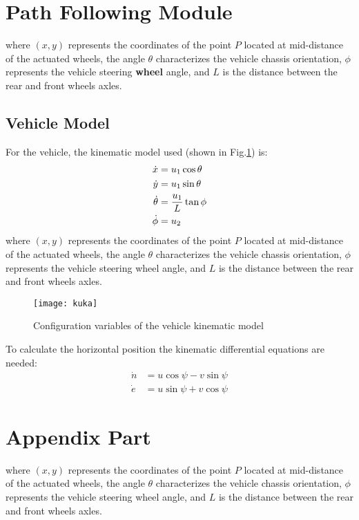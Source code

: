 \section{Path Following Module }
where $(x, y)$ represents the coordinates of the point $P$ located at mid-distance of the actuated wheels, the angle $\theta$ characterizes the vehicle chassis orientation, $\phi$ represents the vehicle steering \textbf{wheel} angle, and $L$ is the distance between the rear and front wheels axles.

\subsection{Vehicle Model}
For the vehicle, the kinematic model used (shown in Fig.\ref{fig:configurationVariables}) is:
\begin{align}
\dot{x} &= u_1 \cos\theta \notag\\
\dot{y} &= u_1 \sin\theta \notag\\
\dot{\theta} &=\frac{u_1 }{L} \tan\phi \notag\\
\dot{\phi} &= u_2
\label{eq:kinematicModel}
\end{align}
where $(x, y)$ represents the coordinates of the point $P$ located at mid-distance of the actuated wheels, the angle $\theta$ characterizes the vehicle chassis orientation, $\phi$ represents the vehicle steering wheel angle, and $L$ is the distance between the rear and front wheels axles.
\begin{figure}[htbp]
	\centering
    \texttt{[image: kuka]}
    \caption{Configuration variables of the vehicle kinematic model}
	\label{fig:configurationVariables}
\end{figure}

 \begin{mytheo}
    To calculate the horizontal position the kinematic differential equations are needed:
    \begin{align}
    \dot{n} &= u\cos\psi -v\sin\psi \\
    \dot{e} &= u\sin\psi + v\cos\psi
    \end{align}
\end{mytheo}

\newpage
\appendix
\section{Appendix Part }
where $(x, y)$ represents the coordinates of the point $P$ located at mid-distance of the actuated wheels, the angle $\theta$ characterizes the vehicle chassis orientation, $\phi$ represents the vehicle steering wheel angle, and $L$ is the distance between the rear and front wheels axles.

